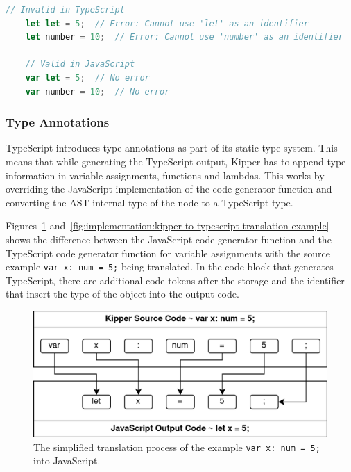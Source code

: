 \begin{lstlisting}[float,language=TypeScript,caption=Reserved Keywords in TS and JS,label=lst:implementation:reservedkeywords]
	// Invalid in TypeScript
	let let = 5;  // Error: Cannot use 'let' as an identifier
	let number = 10;  // Error: Cannot use 'number' as an identifier
	
	// Valid in JavaScript
	var let = 5;  // No error
	var number = 10;  // No error
\end{lstlisting}

\subsubsection{Type Annotations}

TypeScript introduces type annotations as part of its static type system. This means that while generating the TypeScript output, Kipper has to append type information in variable assignments, functions and lambdas. This works by overriding the JavaScript implementation of the code generator function and converting the AST-internal type of the node to a TypeScript type. 

Figures~\ref{fig:implementation:kipper-to-javascript-translation-example} and~\ref{fig:implementation:kipper-to-typescript-translation-example} shows the difference between the JavaScript code generator function and the TypeScript code generator function for variable assignments with the source example \lstinline|var x: num = 5;| being translated. In the code block that generates TypeScript, there are additional code tokens after the storage and the identifier that insert the type of the object into the output code.

\begin{figure}[h!]
	\centering
	\includegraphics[scale=1.1]{./pics/Kipper-to-JavaScript-Translation-Example}
	\caption{The simplified translation process of the example \lstinline|var x: num = 5;| into JavaScript.}
	\label{fig:implementation:kipper-to-javascript-translation-example}
\end{figure}

